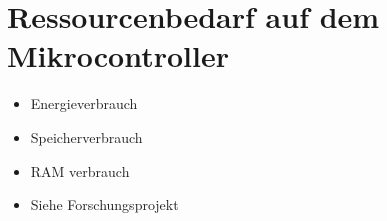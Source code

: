 \section{Ressourcenbedarf auf dem Mikrocontroller}
\begin{itemize}
    \item Energieverbrauch
    \item Speicherverbrauch
    \item RAM verbrauch
    \item Siehe Forschungsprojekt
\end{itemize}